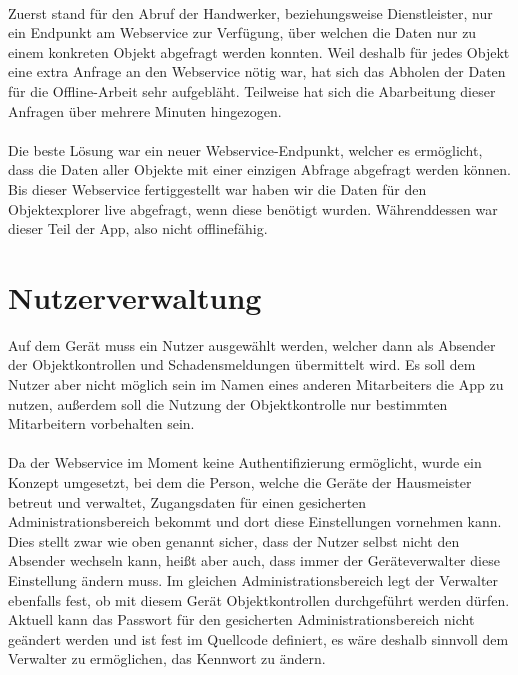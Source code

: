 \documentclass[12pt]{article}
\begin{document}
\paragraph{}Zuerst stand für den Abruf der Handwerker, beziehungsweise Dienstleister, nur ein Endpunkt am Webservice zur Verfügung, über welchen die Daten nur zu einem konkreten Objekt abgefragt werden konnten. Weil deshalb für jedes Objekt eine extra Anfrage an den Webservice nötig war, hat sich das Abholen der Daten für die Offline-Arbeit sehr aufgebläht. Teilweise hat sich die Abarbeitung dieser Anfragen über mehrere Minuten hingezogen.

\paragraph{}Die beste Lösung war ein neuer Webservice-Endpunkt, welcher es ermöglicht, dass die Daten aller Objekte mit einer einzigen Abfrage abgefragt werden können. Bis dieser Webservice fertiggestellt war haben wir die Daten für den Objektexplorer live abgefragt, wenn diese benötigt wurden. Währenddessen war dieser Teil der App, also nicht offlinefähig.

\section{Nutzerverwaltung}
Auf dem Gerät muss ein Nutzer ausgewählt werden, welcher dann als Absender der Objektkontrollen und Schadensmeldungen übermittelt wird. Es soll dem Nutzer aber nicht möglich sein im Namen eines anderen Mitarbeiters die App zu nutzen, außerdem soll die Nutzung der Objektkontrolle nur bestimmten Mitarbeitern vorbehalten sein.

\paragraph{}Da der Webservice im Moment keine Authentifizierung ermöglicht, wurde ein Konzept umgesetzt, bei dem die Person, welche die Geräte der Hausmeister betreut und verwaltet, Zugangsdaten für einen gesicherten Administrationsbereich bekommt und dort diese Einstellungen vornehmen kann. Dies stellt zwar wie oben genannt sicher, dass der Nutzer selbst nicht den Absender wechseln kann, heißt aber auch, dass immer der Geräteverwalter diese Einstellung ändern muss. Im gleichen Administrationsbereich legt der Verwalter ebenfalls fest, ob mit diesem Gerät Objektkontrollen durchgeführt werden dürfen. Aktuell kann das Passwort für den gesicherten Administrationsbereich nicht geändert werden und ist fest im Quellcode definiert, es wäre deshalb sinnvoll dem Verwalter zu ermöglichen, das Kennwort zu ändern.
\end{document}
